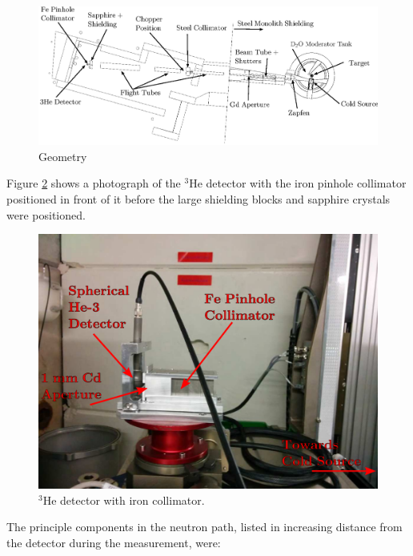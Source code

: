 \documentclass[preprint,12pt]{elsarticle}
\begin{document}
\begin{figure}[h!] 
  \centering
    \includegraphics[width=\textwidth]{graphics/geom_bw_labels.eps}
     \caption{Geometry \label{fig:geom} }
\end{figure}

Figure \ref{fig:det} shows a photograph of the $^3$He detector with the iron pinhole collimator positioned in front of it before the large shielding blocks and sapphire crystals were positioned.

\begin{figure}[h!] 
  \centering
    \includegraphics[width=\textwidth]{graphics/det.eps}
     \caption{$^3$He detector with iron collimator. \label{fig:det}}
\end{figure}

The principle components in the neutron path, listed in increasing distance from the detector during the measurement, were:
\end{document}
